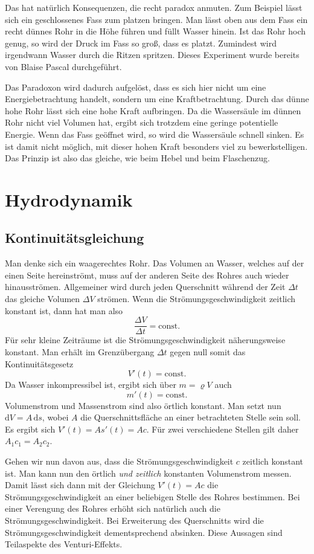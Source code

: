 \documentclass[a4paper,10pt,fleqn,twocolumn,twoside]{scrartcl}
\begin{document}
Das hat natürlich Konsequenzen, die recht paradox anmuten.
Zum Beispiel lässt sich ein geschlossenes Fass zum platzen bringen.
Man lässt oben aus dem Fass ein recht dünnes Rohr in die Höhe führen
und füllt Wasser hinein. Ist das Rohr hoch genug, so wird der Druck
im Fass so groß, dass es platzt. Zumindest wird irgendwann Wasser
durch die Ritzen spritzen. Dieses Experiment wurde bereits von
Blaise Pascal durchgeführt.

Das Paradoxon wird dadurch aufgelöst, dass es sich hier nicht um
eine Energiebetrachtung handelt, sondern um eine Kraftbetrachtung.
Durch das dünne hohe Rohr lässt sich eine hohe Kraft aufbringen.
Da die Wassersäule im dünnen Rohr nicht viel Volumen hat, ergibt sich
trotzdem eine geringe potentielle Energie. Wenn das Fass geöffnet
wird, so wird die Wassersäule schnell sinken. Es ist damit nicht
möglich, mit dieser hohen Kraft besonders viel zu bewerkstelligen.
Das Prinzip ist also das gleiche, wie beim Hebel und beim Flaschenzug.

\section{Hydrodynamik}
\subsection{Kontinuitätsgleichung}
Man denke sich ein waagerechtes Rohr. Das Volumen an Wasser, welches
auf der einen Seite hereinströmt, muss auf der anderen Seite des
Rohres auch wieder hinausströmen. Allgemeiner wird durch jeden
Querschnitt während der Zeit $\Delta t$ das gleiche Volumen
$\Delta V$ strömen. Wenn die Strömungsgeschwindigkeit zeitlich
konstant ist, dann hat man also%
\[\frac{\Delta V}{\Delta t} = \mathrm{const.}\]
Für sehr kleine Zeiträume ist die Strömungsgeschwindigkeit
näherungsweise konstant. Man erhält im Grenzübergang $\Delta t$
gegen null somit das Kontinuitätsgesetz%
\[V'(t) = \mathrm{const.}\]
Da Wasser inkompressibel ist, ergibt sich über $m=\varrho V$ auch%
\[m'(t) = \mathrm{const.}\]
Volumenstrom und Massenstrom sind also örtlich konstant.
Man setzt nun $\mathrm dV=A\,\mathrm ds$, wobei $A$ die
Querschnittsfläche an einer betrachteten Stelle sein soll.
Es ergibt sich $V'(t) = As'(t) = Ac$. Für zwei verschiedene
Stellen gilt daher $A_1c_1 = A_2c_2$.

Gehen wir nun davon aus, dass die Strömungsgeschwindigkeit $c$
zeitlich konstant ist. Man kann nun den örtlich \textit{und zeitlich}
konstanten Volumenstrom messen. Damit lässt sich dann mit der
Gleichung $V'(t) = Ac$ die Strömungsgeschwindigkeit an einer
beliebigen Stelle des Rohres bestimmen. Bei einer Verengung des
Rohres erhöht sich natürlich auch die Strömungsgeschwindigkeit.
Bei Erweiterung des Querschnitts wird die Strömungsgeschwindigkeit
dementsprechend absinken. Diese Aussagen sind Teilaspekte des
Venturi-Effekts.
\end{document}
